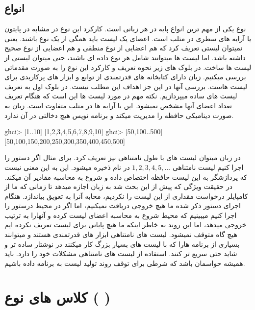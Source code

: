 \subsection{
انواع 
}
نوع 
یکی از مهم ترین انواع پایه در هر زبانی است. کارکرد این نوع در 
مشابه 
 در پایتون یا  آرایه های سطری در متلب است. اعضای یک لیست باید همگی از یک نوع باشند. یعنی نمیتوان لیستی تعریف کرد که هم اعضایی از نوع منطقی و هم اعضایی از نوع صحیح داشته باشد. اما لیست ها میتوانند شامل هر نوع داده ای باشند، حتی میتوان لیستی از لیست ها ساخت. در بلوک های زیر نحوه تعریف و کارکرد این نوع را به صورت مقدماتی بررسی میکنیم. زبان 
دارای کتابخانه های قدرتمندی از توابع و ابزار های پرکاربدی برای لیست هاست. بررسی آنها در این جز اهداف این مطلب نیست.
\newline
در بلوک اول به تعریف لیست های ساده میپردازیم. نکته مهم در مورد لیست ها این است که هنگام تعریف تعداد اعضای آنها مشخص نمیشود. این با آرابه ها در متلب متفاوت است. زبان 
به صورت دینامیکی حافظه را مدیریت میکند و برنامه نویس هیچ دخالتی در آن ندارد. 
\begin{latin}
\begin{ghcode}
ghci> [1..10]
[1,2,3,4,5,6,7,8,9,10]
ghci> [50,100..500]
[50,100,150,200,250,300,350,400,450,500]
\end{ghcode}
\end{latin}
در زبان 
میتوان لیست های با طول نامتناهی نیز تعریف کرد. برای مثال اگر دستور 
 را اجرا کنیم لیست نامتناهی 
$1, 2, 3, 4, 5, ...$
در نام 
ذخیره میشود. این به این معنی نیست که پردازشگر به این لیست حافظه اختصاص داده و شروع به محاسبه مقادیر آن میکند. در حقیقت ویژگی 
که پیش از این بحث شد به زبان اجازه میدهد تا زمانی که ما از کامپایلر درخواست مقداری از این لیست را نکردیم، محابه آنرا به تعویق بیاندازد. هنگام اجرای دستور ذکر شده ما هیچ خروجی دریافت نمیکنیم، اما اگر در محیط 
درستور 
را اجرا کنیم میبینیم که محیط شروع به محاسبه اعضای لیست کرده و آنهارا به ترتیب خروجی میدهد، اما این روند به خاطر اینکه ما هیچ پایانی برای لیست تعریف نکرده ایم هیچ گاه متوقف نمیشود. لیست های نامتناهی ابزار های قدرتمندی هستند و میتوانند بسیاری از برنامه هارا که با لیست های بسیار بزرگ کار میکنند در نوشتار ساده تر و شاید حتی سریع تر کنند. استفاده از لیست های نامتناهی مشکلات خود را دارد. باید همیشه حواسمان باشد که شرطی برای توقف روند تولید لیست به برنامه داده باشیم. 

\section{
کلاس های نوع (
 )
}
